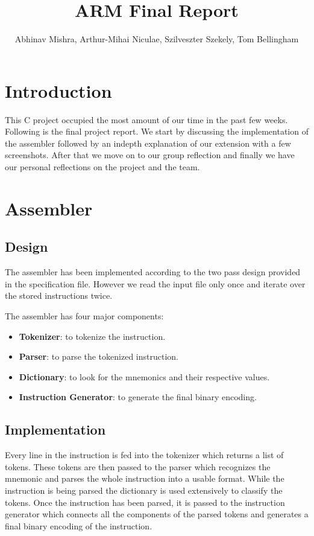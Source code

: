 \documentclass[11pt]{article}
\begin{document}
\title{ARM Final Report}
\author{
  Abhinav Mishra,
  Arthur-Mihai Niculae,
  Szilveszter Szekely,
  Tom Bellingham
}

\maketitle

\section{Introduction}

This C project occupied the most amount of our time in the past few weeks.
Following is the final project report. We start by discussing the
implementation of the assembler followed by an indepth explanation of our
extension with a few screenshots. After that we move on to our group reflection
and finally we have our personal reflections on the project and the team.

\section{Assembler}

\subsection{Design}

The assembler has been implemented according to the two pass design provided in
the specification file. However we read the input file only once and iterate
over the stored instructions twice.

The assembler has four major components:
\begin{itemize}[noitemsep,topsep=0pt]
  \item \textbf{Tokenizer}:
    to tokenize the instruction.
  \item \textbf{Parser}:
    to parse the tokenized instruction.
  \item \textbf{Dictionary}:
    to look for the mnemonics and their respective values.
  \item \textbf{Instruction Generator}:
    to generate the final binary encoding.
\end{itemize}

\subsection{Implementation}

Every line in the instruction is fed into the tokenizer which returns a list
of tokens. These tokens are then passed to the parser which recognizes the
mnemonic and parses the whole instruction into a usable format. While the
instruction is being parsed the dictionary is used extensively to classify the
tokens. Once the instruction has been parsed, it is passed to the instruction
generator which connects all the components of the parsed tokens and generates
a final binary encoding of the instruction.
\end{document}
